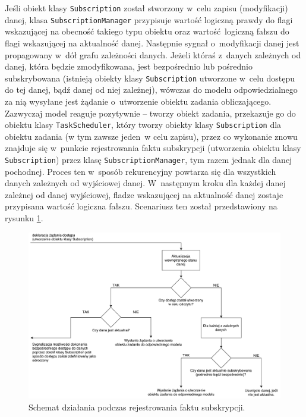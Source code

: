 Jeśli obiekt klasy \lstinline$Subscription$ został stworzony w~celu zapisu (modyfikacji) danej, klasa \lstinline$SubscriptionManager$ przypisuje wartość logiczną prawdy do flagi wskazującej na obecność takiego typu obiektu oraz wartość logiczną fałszu do flagi wskazującej na aktualność danej. Następnie sygnał o~modyfikacji danej jest propagowany w~dół grafu zależności danych. Jeżeli któraś z~danych zależnych od danej, która będzie zmodyfikowana, jest bezpośrednio lub pośrednio subskrybowana (istnieją obiekty klasy \lstinline$Subscription$ utworzone w~celu dostępu do tej danej, bądź danej od niej zależnej), wówczas do modelu odpowiedzialnego za nią wysyłane jest żądanie o~utworzenie obiektu zadania obliczającego. Zazwyczaj model reaguje pozytywnie -- tworzy obiekt zadania, przekazuje go do obiektu klasy \lstinline$TaskScheduler$, który tworzy obiekty klasy \lstinline$Subscription$ dla obiektu zadania (w tym zawsze jeden w celu zapisu), przez co wykonanie znowu znajduje się w~punkcie rejestrowania faktu subskrypcji (utworzenia obiektu klasy \lstinline$Subscription$) przez klasę \lstinline$SubscriptionManager$, tym razem jednak dla danej pochodnej. Proces ten w~sposób rekurencyjny powtarza się dla wszystkich danych zależnych od wyjściowej danej. W~następnym kroku dla każdej danej zależnej od danej wyjściowej, fladze wskazującej na aktualność danej zostaje przypisana wartość logiczna fałszu. Scenariusz ten został przedstawiony na rysunku \ref{fig:subscribe}.

\begin{figure}[ht]
	\centering
	\includegraphics[width=1\linewidth]{rys05/subscribe}
	\caption{Schemat działania podczas rejestrowania faktu subskrypcji.}
	\label{fig:subscribe}	
\end{figure}

